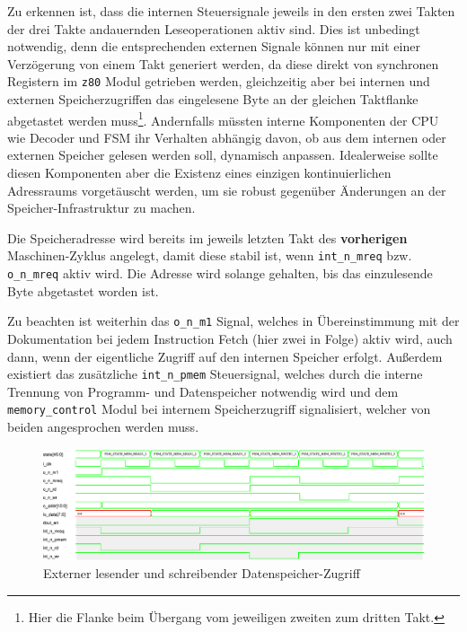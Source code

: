 \documentclass[ngerman, cd=lightcolor]{tudscrreprt}
\begin{document}
Zu erkennen ist, dass die internen Steuersignale jeweils in den ersten zwei
Takten der drei Takte andauernden Leseoperationen aktiv sind. Dies ist
unbedingt notwendig, denn die entsprechenden externen Signale können nur mit
einer Verzögerung von einem Takt generiert werden, da diese direkt von
synchronen Registern im \texttt{z80} Modul getrieben werden, gleichzeitig aber
bei internen und externen Speicherzugriffen das eingelesene Byte an der
gleichen Taktflanke abgetastet werden muss\footnote{Hier die Flanke beim
Übergang vom jeweiligen zweiten zum dritten Takt.}. Andernfalls müssten interne
Komponenten der CPU wie Decoder und FSM ihr Verhalten abhängig davon, ob
aus dem internen oder externen Speicher gelesen werden soll, dynamisch anpassen.
Idealerweise sollte diesen Komponenten aber die Existenz eines einzigen
kontinuierlichen Adressraums vorgetäuscht werden, um sie robust gegenüber
Änderungen an der Speicher-Infrastruktur zu machen.

Die Speicheradresse wird bereits im jeweils letzten Takt des
\textbf{vorherigen} Maschinen-Zyklus angelegt, damit diese stabil ist, wenn
\texttt{int\_n\_mreq} bzw. \texttt{o\_n\_mreq} aktiv wird. Die Adresse wird
solange gehalten, bis das einzulesende Byte abgetastet worden ist.

Zu beachten ist weiterhin das \texttt{o\_n\_m1} Signal, welches in
Übereinstimmung mit der Dokumentation bei jedem Instruction Fetch (hier zwei in
Folge) aktiv wird, auch dann, wenn der eigentliche Zugriff auf den internen
Speicher erfolgt. Außerdem existiert das zusätzliche \texttt{int\_n\_pmem}
Steuersignal, welches durch die interne Trennung von Programm- und
Datenspeicher notwendig wird und dem \texttt{memory\_control} Modul bei
internem Speicherzugriff signalisiert, welcher von beiden angesprochen werden
muss.

\begin{figure}[htbp]
  \centering
    \includegraphics[width=\textwidth]{resources/pdf/mem-read-write.pdf}
  \caption{Externer lesender und schreibender Datenspeicher-Zugriff}
  \label{img:mem-read-write}
\end{figure}
\end{document}
